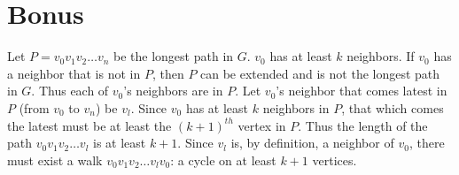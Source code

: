 \documentclass{article}
\begin{document}
\section{Bonus} %
Let $P=v_0v_1v_2\ldots{v_n}$ be the longest path in $G$. $v_0$ has at least $k$ neighbors. If $v_0$ has a neighbor that is not in $P$, then $P$ can be
extended and is not the longest path in $G$. Thus each of $v_0$'s neighbors are in $P$. Let $v_0$'s neighbor that comes latest in $P$ (from $v_0$ to $v_n$)
be $v_l$. Since $v_0$ has at least $k$ neighbors in $P$, that which comes the latest must be at least the ${(k+1)}^{th}$ vertex in $P$. Thus the length of
the path $v_0v_1v_2\ldots{v_l}$ is at least $k+1$. Since $v_l$ is, by definition, a neighbor of $v_0$, there must exist a walk $v_0v_1v_2\ldots{v_l}v_0$:
a cycle on at least $k+1$ vertices.
\end{document}
